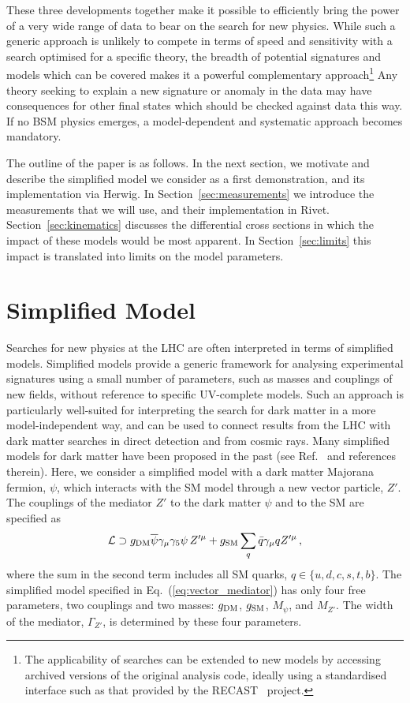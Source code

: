 \documentclass[floatfix]{article}
\begin{document}
These three developments together make it possible to efficiently 
bring the power of a very wide range of data to bear on the search for new physics. While such a generic approach is
unlikely to compete in terms of speed and sensitivity with a search optimised for a specific theory, the breadth
of potential signatures and models which can be covered makes it a powerful complementary approach\footnote{The applicability of 
searches can be extended to new models by accessing archived versions of the original analysis code, ideally using a standardised 
interface such as that provided by the RECAST~\cite{Cranmer:2010hk} project.}
Any theory seeking
to explain a new signature or anomaly in the data may have consequences for other final states which should be checked 
against data this way. If no BSM physics emerges, a model-dependent and systematic approach becomes mandatory.

The outline of the paper is as follows. In the next section, we motivate and describe the 
simplified model we consider as a first demonstration, and its implementation via Herwig. 
In Section~\ref{sec:measurements} we introduce the measurements that we will use, and their implementation in Rivet. 
Section~\ref{sec:kinematics} discusses the differential cross sections in which the impact of these models would be 
most apparent. In Section~\ref{sec:limits} this impact is translated into limits on the model parameters.


\section{Simplified Model}\label{sec:models}
Searches for new physics at the LHC are often interpreted in terms of simplified models. Simplified models provide a generic 
framework for analysing experimental signatures using a small number of parameters, such as masses and 
couplings of new fields, without reference to specific UV-complete models. Such an  approach is particularly 
well-suited for interpreting the search for dark matter in a more model-independent way, and can be used to connect results from the LHC with dark matter 
searches in direct detection and from cosmic rays. Many simplified models for dark matter have been proposed 
in the past (see Ref.~\cite{Abercrombie:2015wmb} and references therein). Here, we consider a simplified model with a dark matter Majorana 
fermion, $\psi$, which interacts with the SM model through a new vector particle, $Z'$. The couplings of the mediator $Z'$ to the dark matter $\psi$ and to the 
SM are specified as %
\begin{align}\label{eq:vector_mediator}
 {\cal L} \supset  g_{\rm DM}\overline{\psi} \gamma_{\mu}\gamma_5 \psi\,Z'^{\mu} + g_{\rm SM}\sum_{q} \bar q \gamma_{\mu} q Z'^{\mu} \,,
\end{align}
%
where the sum in the second term includes all SM quarks, $q \in \{u,d,c,s,t,b\}$. The simplified model specified in Eq.~(\ref{eq:vector_mediator}) has only four free parameters, two couplings and two masses: $g_{\rm DM}$, $g_{\rm SM}$, $M_\psi$, and $M_{Z'}$. The width of the mediator, $\Gamma_{Z'}$, is determined by these four parameters. 
\end{document}
